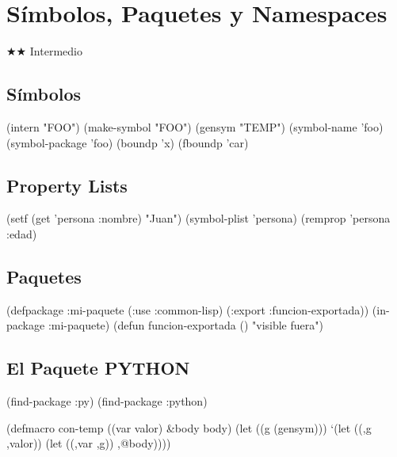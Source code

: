 \chapter{Símbolos, Paquetes y Namespaces}
\label{chap:packages}
{\huge$\bigstar$}{\huge$\bigstar$} Intermedio

\section{Símbolos}
\begin{lispcode}
(intern "FOO")
(make-symbol "FOO")
(gensym "TEMP")
(symbol-name 'foo)
(symbol-package 'foo)
(boundp 'x)
(fboundp 'car)
\end{lispcode}

\section{Property Lists}
\begin{lispcode}
(setf (get 'persona :nombre) "Juan")
(symbol-plist 'persona)
(remprop 'persona :edad)
\end{lispcode}

\section{Paquetes}
\begin{lispcode}
(defpackage :mi-paquete (:use :common-lisp) (:export :funcion-exportada))
(in-package :mi-paquete)
(defun funcion-exportada () "visible fuera")
\end{lispcode}

\section{El Paquete PYTHON}
\begin{lispcode}
(find-package :py)
(find-package :python)
\end{lispcode}

\begin{examplebox}[title=Gensym para higiene en macros]
\begin{lispcode}
(defmacro con-temp ((var valor) &body body)
  (let ((g (gensym)))
    `(let ((,g ,valor)) (let ((,var ,g)) ,@body))))
\end{lispcode}
\end{examplebox}

